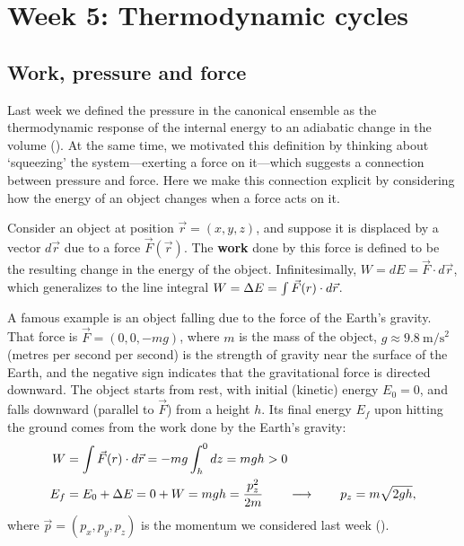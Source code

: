 \renewcommand{\thisweek}{MATH327 Week 5}
\renewcommand{\moddate}{Last modified 27 Feb.~2021}
\setcounter{section}{5}
\setcounter{subsection}{0}
{}
\section*{Week 5: Thermodynamic cycles}
\subsection{Work, pressure and force}
Last week we defined the pressure in the canonical ensemble as the thermodynamic response of the internal energy to an adiabatic change in the volume ().
At the same time, we motivated this definition by thinking about `squeezing' the system---exerting a force on it---which suggests a connection between pressure and force.
Here we make this connection explicit by considering how the energy of an object changes when a force acts on it.

\begin{shaded}
  Consider an object at position $\vec r = (x, y, z)$, and suppose it is displaced by a vector $d\vec r$ due to a force $\vec F(\vec r)$.
  The \textbf{work} done by this force is defined to be the resulting change in the energy of the object.
  Infinitesimally, $W = dE = \vec F\cdot d\vec r$, which generalizes to the line integral $W = \Delta E = \int \vec F(r)\cdot d\vec r$.
\end{shaded}

A famous example is an object falling due to the force of the Earth's gravity.
That force is $\vec F = (0, 0, -mg)$, where $m$ is the mass of the object, $g \approx 9.8~\mathrm{m}/\mathrm{s}^2$ (metres per second per second) is the strength of gravity near the surface of the Earth, and the negative sign indicates that the gravitational force is directed downward.
The object starts from rest, with initial (kinetic) energy $E_0 = 0$, and falls downward (parallel to $\vec F$) from a height $h$.
Its final energy $E_f$ upon hitting the ground comes from the work done by the Earth's gravity:
\begin{align*}
  W & = \int \vec F(r)\cdot d\vec r = -mg \int_h^0 dz = mgh > 0 \\
  E_f & = E_0 + \Delta E = 0 + W = mgh = \frac{p_z^2}{2m} \qquad \longrightarrow \qquad p_z = m\sqrt{2gh},
\end{align*}
where $\vec p = (p_x, p_y, p_z)$ is the momentum we considered last week ().

